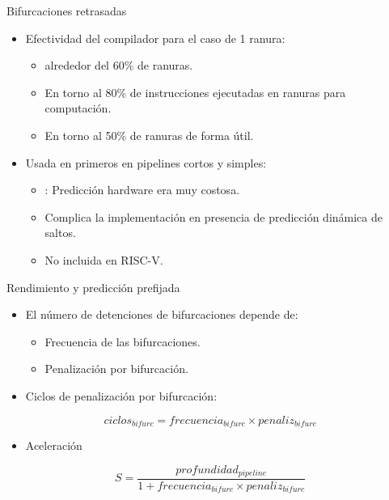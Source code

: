 \begin{frame}[t]{Bifurcaciones retrasadas}
\begin{itemize}
  \item Efectividad del compilador para el caso de 1 ranura:
    \begin{itemize}
      \item {} alrededor del 60\% de ranuras.
      \item En torno al 80\% de instrucciones ejecutadas en ranuras  para computación.
      \item En torno al 50\% de ranuras  de forma útil.
    \end{itemize}

  \item Usada en primeros en pipelines cortos y simples:
    \begin{itemize}
      \item {}: Predicción hardware era muy costosa.
      \item Complica la implementación en presencia de predicción dinámica de saltos.
      \item No incluida en RISC-V.
    \end{itemize}
\end{itemize}
\end{frame}

\begin{frame}[t]{Rendimiento y predicción prefijada}
\begin{itemize}
  \item El número de detenciones de bifurcaciones depende de:
    \begin{itemize}
      \item Frecuencia de las bifurcaciones.
      \item Penalización por bifurcación.
    \end{itemize}
\end{itemize}
\begin{itemize}
  \item Ciclos de penalización por bifurcación:
\end{itemize}
\begin{displaymath}
ciclos_{bifurc} = frecuencia_{bifurc} \times penaliz_{bifurc}
\end{displaymath}
\begin{itemize}
  \item Aceleración
\end{itemize}
\begin{displaymath}
S =
\frac{profundidad_{pipeline}}{1 + frecuencia_{bifurc} \times penaliz_{bifurc}}
\end{displaymath}
\end{frame}

